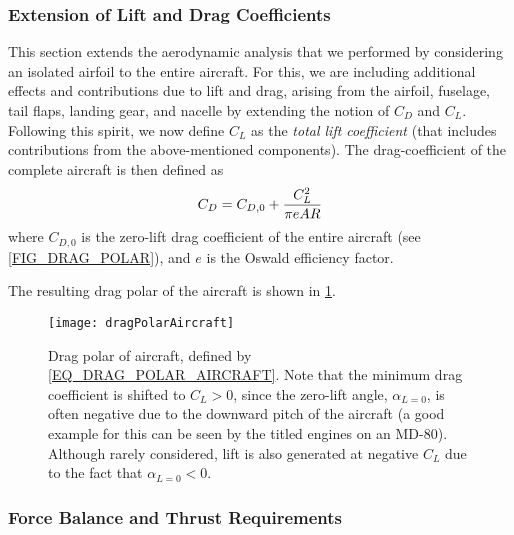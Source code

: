 \subsubsection{Extension of Lift and Drag Coefficients}
This section extends the aerodynamic analysis that we performed by considering an isolated airfoil to the entire aircraft. For this, we are including additional effects and contributions due to lift and drag, arising from the airfoil, fuselage, tail flaps, landing gear, and nacelle by extending the notion of $C_D$ and $C_L$. Following this spirit, we now define $C_L$ as the {\it total lift coefficient} (that includes contributions from the above-mentioned components). The drag-coefficient of the complete aircraft is then defined as
\begin{equation}
  \label{EQ_DRAG_POLAR_AIRCRAFT}
  C_D = C_{D,0} + {\frac{C^2_L}{\pi e AR}}
\end{equation}
where $C_{D,0}$ is the zero-lift drag coefficient of the entire aircraft (see \cref{FIG_DRAG_POLAR}), and $e$ is the Oswald efficiency factor.

The resulting drag polar of the aircraft is shown in \cref{FIG_DRAG_POLAR_AIRCRAFT}.

\begin{figure}[!h!]
  \begin{center}
    \texttt{[image: dragPolarAircraft]}
    \caption{\label{FIG_DRAG_POLAR_AIRCRAFT}Drag polar of aircraft, defined by \cref{EQ_DRAG_POLAR_AIRCRAFT}. Note that the minimum drag coefficient is shifted to $C_L>0$, since the zero-lift angle, $\alpha_{L=0}$, is often negative due to the downward pitch of the aircraft (a good example for this can be seen by the titled engines on an MD-80). Although rarely considered, lift is also generated at negative $C_L$ due to the fact that $\alpha_{L=0}<0$.}
  \end{center}
\end{figure}

\subsubsection{Force Balance and Thrust Requirements}

